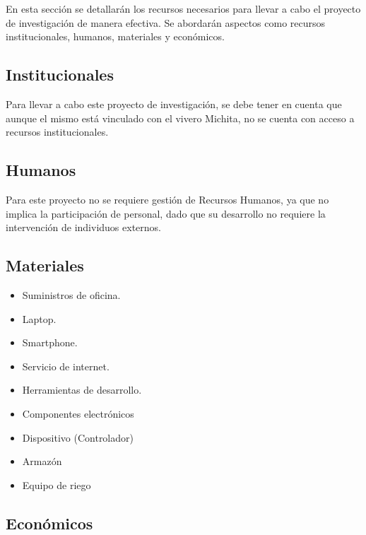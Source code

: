 En esta sección se detallarán los recursos necesarios para llevar a cabo el proyecto de investigación de manera efectiva. Se abordarán aspectos como recursos institucionales, humanos, materiales y económicos.
\subsection{Institucionales}
Para llevar a cabo este proyecto de investigación, se debe tener en cuenta que aunque el mismo está vinculado con el vivero Michita, no se cuenta con acceso a recursos institucionales.

\subsection{Humanos}
Para este proyecto no se requiere gestión de Recursos Humanos, ya que no implica la participación de personal, dado que su desarrollo no requiere la intervención de individuos externos.

\subsection{Materiales}
\begin{itemize}
	\item Suministros de oficina.
	\item Laptop.
	\item Smartphone.
	\item Servicio de internet.
	\item Herramientas de desarrollo.
	\item Componentes electrónicos
	\item Dispositivo (Controlador)
	\item Armazón
	\item Equipo de riego
\end{itemize}

\newpage
\subsection{Económicos}

